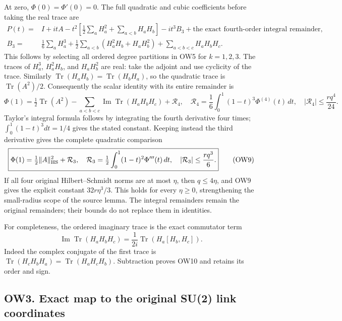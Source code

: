 \documentclass[11pt]{article}
\begin{document}
At zero, \(\Phi(0)=\Phi'(0)=0\). The full quadratic and cubic coefficients before taking the real trace are
\[
 \begin{aligned}
 P(t)={}&I+itA-t^2\left[\tfrac12\sum_aH_a^2+
                  \sum_{a<b}H_aH_b\right]-it^3 B_3
                  +\text{the exact fourth-order integral remainder},\\
 B_3={}&\tfrac16\sum_aH_a^3+
 \tfrac12\sum_{a<b}(H_a^2H_b+H_aH_b^2)
                  +\sum_{a<b<c}H_aH_bH_c .
 \end{aligned}                                               \tag{OW7}
\]
This follows by selecting all ordered degree partitions in OW5 for \(k=1,2,3\). The traces of \(H_a^3\), \(H_a^2H_b\), and \(H_aH_b^2\) are real: take the adjoint and use cyclicity of the trace. Similarly \(\operatorname{Tr}(H_aH_b)=\operatorname{Tr}(H_bH_a)\), so the quadratic trace is \(\operatorname{Tr}(A^2)/2\). Consequently the scalar identity with its entire remainder is
\[
 \boxed{\Phi(1)=\tfrac12\operatorname{Tr}(A^2)
 -\sum_{a<b<c}\operatorname{Im}\operatorname{Tr}(H_aH_bH_c)
 +\mathcal R_4,\quad
 \mathcal R_4=\frac16\int_0^1(1-t)^3\Phi^{(4)}(t)\,dt,\quad
 |\mathcal R_4|\le\frac{r q^4}{24}.}                     \tag{OW8}
\]
Taylor's integral formula follows by integrating the fourth derivative four times; \(\int_0^1(1-t)^3dt=1/4\) gives the stated constant. Keeping instead the third derivative gives the complete quadratic comparison
\[
 \boxed{\Phi(1)=\tfrac12\|A\|_{\rm HS}^{2}+\mathcal R_3,
 \quad \mathcal R_3=\tfrac12\int_0^1(1-t)^2\Phi'''(t)\,dt,
 \quad |\mathcal R_3|\le\frac{r q^3}{6}.}                \tag{OW9}
\]
If all four original Hilbert–Schmidt norms are at most \(\eta\), then \(q\le4\eta\), and OW9 gives the explicit constant \(32r\eta^3/3\). This holds for every \(\eta\ge0\), strengthening the small-radius scope of the source lemma. The integral remainders remain the original remainders; their bounds do not replace them in identities.

For completeness, the ordered imaginary trace is the exact commutator term
\[
 \operatorname{Im}\operatorname{Tr}(H_aH_bH_c)
 =\frac{1}{2i}\operatorname{Tr}(H_a[H_b,H_c]).            \tag{OW10}
\]
Indeed the complex conjugate of the first trace is \(\operatorname{Tr}(H_cH_bH_a)=\operatorname{Tr}(H_aH_cH_b)\). Subtraction proves OW10 and retains its order and sign.

\subsection*{OW3. Exact map to the original SU(2) link coordinates}
\end{document}
